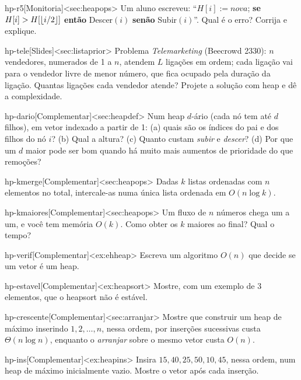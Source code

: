 \begin{exercicio}{hp-r5}[Monitoria]<sec:heapops>
Um aluno escreveu: ``$H[i]:=nova$; \textbf{se} $H[i]>H[\lfloor i/2\rfloor]$ \textbf{então} Descer$(i)$ \textbf{senão} Subir$(i)$''. Qual é o erro? Corrija e explique.
\end{exercicio}
\begin{exercicio}{hp-tele}[Slides]<sec:listaprior>
Problema \emph{Telemarketing} (Beecrowd 2330): $n$ vendedores, numerados de 1 a $n$, atendem $L$ ligações em ordem; cada ligação vai para o vendedor livre de menor número, que fica ocupado pela duração da ligação. Quantas ligações cada vendedor atende? Projete a solução com heap e dê a complexidade.
\end{exercicio}

\excompl
\begin{exercicio}{hp-dario}[Complementar]<sec:heapdef>
Num heap $d$-ário (cada nó tem até $d$ filhos), em vetor indexado a partir de 1: (a) quais são os índices do pai e dos filhos do nó $i$? (b) Qual a altura? (c) Quanto custam \emph{subir} e \emph{descer}? (d) Por que um $d$ maior pode ser bom quando há muito mais aumentos de prioridade do que remoções?
\end{exercicio}
\begin{exercicio}{hp-kmerge}[Complementar]<sec:heapops>
Dadas $k$ listas ordenadas com $n$ elementos no total, intercale-as numa única lista ordenada em $O(n\log k)$.
\end{exercicio}
\begin{exercicio}{hp-kmaiores}[Complementar]<sec:heapops>
Um fluxo de $n$ números chega um a um, e você tem memória $O(k)$. Como obter os $k$ maiores ao final? Qual o tempo?
\end{exercicio}
\begin{exercicio}{hp-verif}[Complementar]<ex:ehheap>
Escreva um algoritmo $O(n)$ que decide se um vetor é um heap.
\end{exercicio}
\begin{exercicio}{hp-estavel}[Complementar]<ex:heapsort>
Mostre, com um exemplo de 3 elementos, que o heapsort não é estável.
\end{exercicio}
\begin{exercicio}{hp-crescente}[Complementar]<sec:arranjar>
Mostre que construir um heap de máximo inserindo $1,2,\dots,n$, nessa ordem, por inserções sucessivas custa $\Theta(n\log n)$, enquanto o \emph{arranjar} sobre o mesmo vetor custa $O(n)$.
\end{exercicio}
\begin{exercicio}{hp-ins}[Complementar]<ex:heapins>
Insira $15,40,25,50,10,45$, nessa ordem, num heap de máximo inicialmente vazio. Mostre o vetor após cada inserção.
\end{exercicio}
